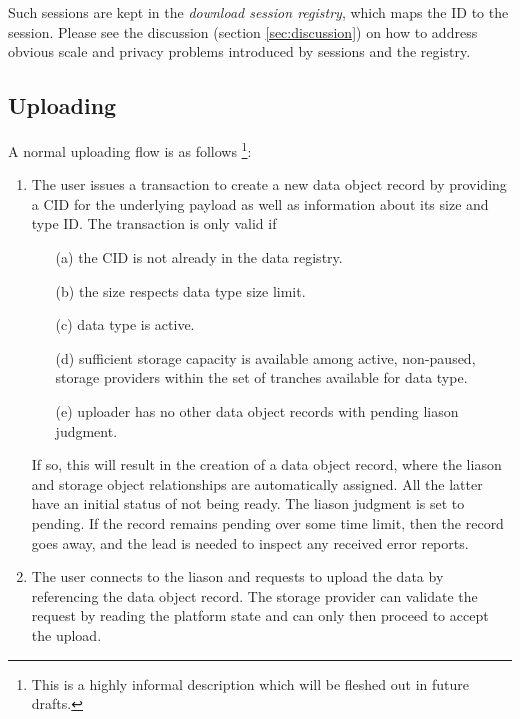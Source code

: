 \documentclass{article}
\begin{document}
Such sessions are kept in the \textit{download session registry}, which maps the ID to the session. Please see the discussion (section \ref{sec:discussion}) on how to address obvious scale and privacy problems introduced by sessions and the registry.

\subsection{Uploading} \label{sec:data_storage_and_distribution:uploading}

A normal uploading flow is as follows \footnote{This is a highly informal description which will be fleshed out in future drafts.}:

\begin{enumerate}

\item
The user issues a transaction to create a new data object record by providing a CID for the underlying payload as well as information about its size and type ID. The transaction is only valid if 

      \begin{itemize}

          \item[(a)] the CID is not already in the data registry.

          \item[(b)] the size respects data type size limit.

          \item[(c)] data type is active.

          \item[(d)] sufficient storage capacity is available among active, non-paused, storage providers within the set of tranches available for data type.

          \item[(e)] uploader has no other data object records with pending liason judgment.

      \end{itemize}

If so, this will result in the creation of a data object record, where the liason and storage object relationships are automatically assigned. All the latter have an initial status of not being ready. The liason judgment is set to pending. If the record remains pending over some time limit, then the record goes away, and the lead is needed to inspect any received error reports.

\item
The user connects to the liason and requests to upload the data by referencing the data object record. The storage provider can validate the request by reading the platform state and can only then proceed to accept the upload.


\end{enumerate}
\end{document}
